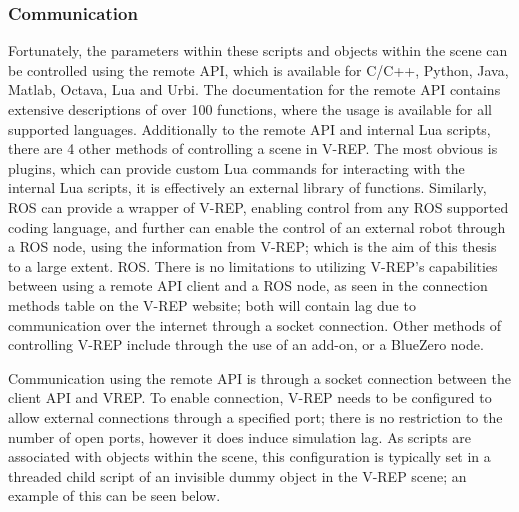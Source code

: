 \documentclass[12pt,openany,a4paper]{book}
\begin{document}
\subsubsection{Communication}
Fortunately, the parameters within these scripts and objects within the scene can be controlled using the remote API, which is available for C/C++, Python, Java, Matlab, Octava, Lua and Urbi. The documentation for the remote API contains extensive descriptions of over 100 functions, where the usage is available for all supported languages. Additionally to the remote API and internal Lua scripts, there are 4 other methods of controlling a scene in V-REP. The most obvious is plugins, which can provide custom Lua commands for interacting with the internal Lua scripts, it is effectively an external library of functions. Similarly, ROS can provide a wrapper of V-REP, enabling control from any ROS supported coding language, and further can enable the control of an external robot through a ROS node, using the information from V-REP; which is the aim of this thesis to a large extent. ROS. There is no limitations to utilizing V-REP's capabilities between using a remote API client and a ROS node, as seen in the connection methods table on the V-REP website; both will contain lag due to communication over the internet through a socket connection. Other methods of controlling V-REP include through the use of an add-on, or a BlueZero node.

Communication using the remote API is through a socket connection between the client API and VREP. To enable connection, V-REP needs to be configured to allow external connections through a specified port; there is no restriction to the number of open ports, however it does induce simulation lag. As scripts are associated with objects within the scene, this configuration is typically set in a threaded child script of an invisible dummy object in the V-REP scene; an example of this can be seen below. 
\end{document}
